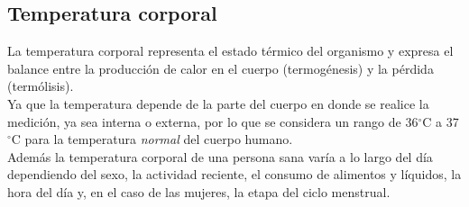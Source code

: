 %	
%	
%	
	
	\subsection{Temperatura corporal}
	La temperatura corporal representa el estado térmico del organismo y expresa el balance entre la producción de calor en el cuerpo (termogénesis) y la pérdida (termólisis). \cite{cobo2011} \\
	
	Ya que la temperatura depende de la parte del cuerpo en donde se realice la medición, ya sea interna o externa, por lo que se considera un rango de 36$^{\circ}$C a 37$^{\circ}$C para la temperatura \textit{normal} del cuerpo humano. \\
	
	Además la temperatura corporal de una persona sana varía a lo largo del día dependiendo del sexo, la actividad reciente, el consumo de alimentos y líquidos, la hora del día y, en el caso de las mujeres, la etapa del ciclo menstrual.  \cite{signosvitales2016} \\
	


